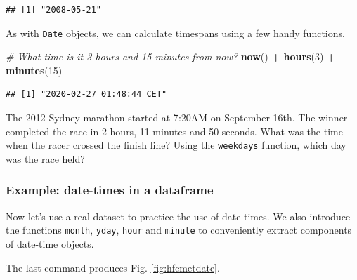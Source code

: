 \documentclass[]{book}
\newenvironment{Shaded}{\begin{snugshade}}{\end{snugshade}}
\newcommand{\CommentTok}[1]{\textcolor[rgb]{0.56,0.35,0.01}{\textit{#1}}}
\newcommand{\DecValTok}[1]{\textcolor[rgb]{0.00,0.00,0.81}{#1}}
\newcommand{\KeywordTok}[1]{\textcolor[rgb]{0.13,0.29,0.53}{\textbf{#1}}}
\newcommand{\NormalTok}[1]{#1}
\newcommand{\OperatorTok}[1]{\textcolor[rgb]{0.81,0.36,0.00}{\textbf{#1}}}
\newcommand{\StringTok}[1]{\textcolor[rgb]{0.31,0.60,0.02}{#1}}
\let\BeginKnitrBlock\begin \let\EndKnitrBlock\end
\begin{document}
\begin{verbatim}
## [1] "2008-05-21"
\end{verbatim}

As with \texttt{Date} objects, we can calculate timespans using a few handy functions.

\begin{Shaded}
\begin{Highlighting}[]
\CommentTok{# What time is it 3 hours and 15 minutes from now?}
\KeywordTok{now}\NormalTok{() }\OperatorTok{+}\StringTok{ }\KeywordTok{hours}\NormalTok{(}\DecValTok{3}\NormalTok{) }\OperatorTok{+}\StringTok{ }\KeywordTok{minutes}\NormalTok{(}\DecValTok{15}\NormalTok{)}
\end{Highlighting}
\end{Shaded}

\begin{verbatim}
## [1] "2020-02-27 01:48:44 CET"
\end{verbatim}

\BeginKnitrBlock{rmdtry}
The 2012 Sydney marathon started at 7:20AM on September 16th. The winner completed the race in 2 hours, 11 minutes and 50 seconds. What was the time when the racer crossed the finish line? Using the \texttt{weekdays} function, which day was the race held?
\EndKnitrBlock{rmdtry}

\hypertarget{example-date-times-in-a-dataframe}{%
\subsubsection{Example: date-times in a dataframe}\label{example-date-times-in-a-dataframe}}

Now let's use a real dataset to practice the use of date-times. We also introduce the functions \texttt{month}, \texttt{yday}, \texttt{hour} and \texttt{minute} to conveniently extract components of date-time objects.

The last command produces Fig. \ref{fig:hfemetdate}.
\end{document}
